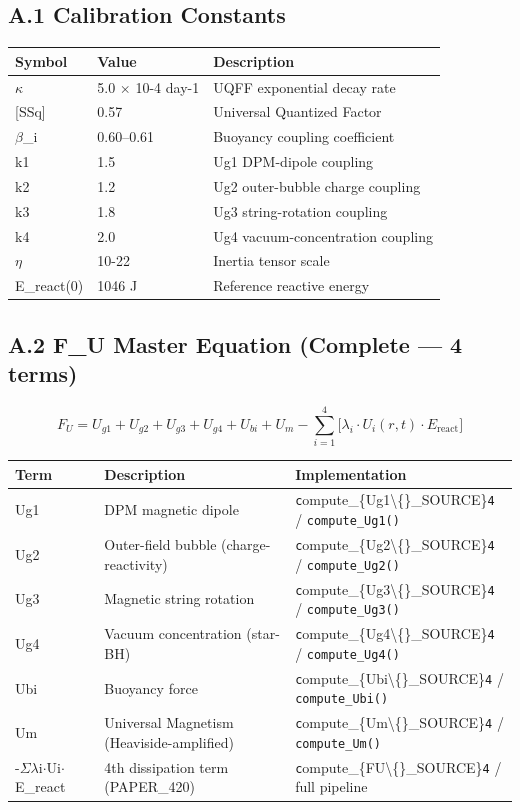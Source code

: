 \documentclass[11pt]{article}
\begin{document}
\subsection*{A.1 Calibration Constants}

\begin{center}
\begin{longtable}{lll}
\toprule
Symbol & Value & Description \tabularnewline
\midrule
\endhead
$\kappa$ & 5.0 $\times$ 10-4 day-1 & UQFF exponential decay rate \tabularnewline
{}[SSq] & 0.57 & Universal Quantized Factor \tabularnewline
$\beta$\_i & 0.60--0.61 & Buoyancy coupling coefficient \tabularnewline
k1 & 1.5 & Ug1 DPM-dipole coupling \tabularnewline
k2 & 1.2 & Ug2 outer-bubble charge coupling \tabularnewline
k3 & 1.8 & Ug3 string-rotation coupling \tabularnewline
k4 & 2.0 & Ug4 vacuum-concentration coupling \tabularnewline
$\eta$ & 10-22 & Inertia tensor scale \tabularnewline
E\_react(0) & 1046 J & Reference reactive energy \tabularnewline
\bottomrule
\end{longtable}
\end{center}

\subsection*{A.2 F\_U Master Equation (Complete --- 4 terms)}

$$F_U = U_{g1} + U_{g2} + U_{g3} + U_{g4} + U_{bi} + U_m - \sum_{i=1}^{4}\bigl[\lambda_i \cdot U_i(r,t) \cdot E_{\mathrm{react}}\bigr]$$

\begin{center}
\begin{longtable}{lll}
\toprule
Term & Description & Implementation \tabularnewline
\midrule
\endhead
Ug1 & DPM magnetic dipole & \verb|c|ompute\_\{Ug1\textbackslash\{\}\_SOURCE\}\verb|4| / \verb|compute_Ug1()| \tabularnewline
Ug2 & Outer-field bubble (charge-reactivity) & \verb|c|ompute\_\{Ug2\textbackslash\{\}\_SOURCE\}\verb|4| / \verb|compute_Ug2()| \tabularnewline
Ug3 & Magnetic string rotation & \verb|c|ompute\_\{Ug3\textbackslash\{\}\_SOURCE\}\verb|4| / \verb|compute_Ug3()| \tabularnewline
Ug4 & Vacuum concentration (star-BH) & \verb|c|ompute\_\{Ug4\textbackslash\{\}\_SOURCE\}\verb|4| / \verb|compute_Ug4()| \tabularnewline
Ubi & Buoyancy force & \verb|c|ompute\_\{Ubi\textbackslash\{\}\_SOURCE\}\verb|4| / \verb|compute_Ubi()| \tabularnewline
Um & Universal Magnetism (Heaviside-amplified) & \verb|c|ompute\_\{Um\textbackslash\{\}\_SOURCE\}\verb|4| / \verb|compute_Um()| \tabularnewline
-$\Sigma$$\lambda$i$\cdot$Ui$\cdot$E\_react & 4th dissipation term (PAPER\_420) & \verb|c|ompute\_\{FU\textbackslash\{\}\_SOURCE\}\verb|4| / full pipeline \tabularnewline
\bottomrule
\end{longtable}
\end{center}
\end{document}
